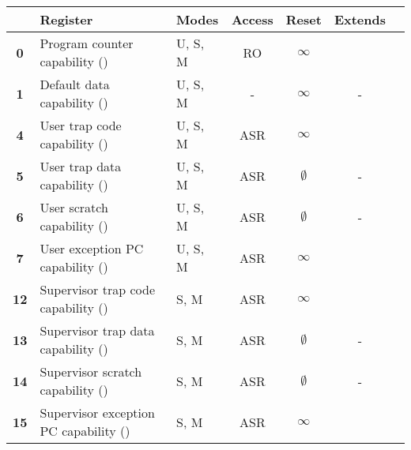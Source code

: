 \begin{table}[h!]
\centering
\begin{tabular}{cllcccc@{}}
\toprule
& \textbf{Register} & \textbf{Modes} & \textbf{Access} & \textbf{Reset} & \textbf{Extends} \\ \midrule
\textbf{0} & Program counter capability (\PCC{})     & U, S, M & RO & $\infty$ & \PC{} \\
\textbf{1} & Default data capability (\DDC{})        & U, S, M & -  & $\infty$ & -     \\
[1.5em]
\textbf{4} & User trap code capability (\UTCC{})     & U, S, M & ASR & $\infty$    & \utvec{} \\
\textbf{5} & User trap data capability (\UTDC{})     & U, S, M & ASR & $\emptyset$ & -        \\
\textbf{6} & User scratch capability (\UScratchC{})  & U, S, M & ASR & $\emptyset$ & -        \\
\textbf{7} & User exception PC capability (\UEPCC{}) & U, S, M & ASR & $\infty$    & \uepc{} \\
[1.5em]

\textbf{12} & Supervisor trap code capability (\STCC{})     & S, M & ASR & $\infty$    & \stvec{} \\
\textbf{13} & Supervisor trap data capability (\STDC{})     & S, M & ASR & $\emptyset$ & -        \\
\textbf{14} & Supervisor scratch capability (\SScratchC{})  & S, M & ASR & $\emptyset$ & -        \\
\textbf{15} & Supervisor exception PC capability (\SEPCC{}) & S, M & ASR & $\infty$    & \sepc{}  \\
[1.5em]


\end{tabular}
\end{table}
